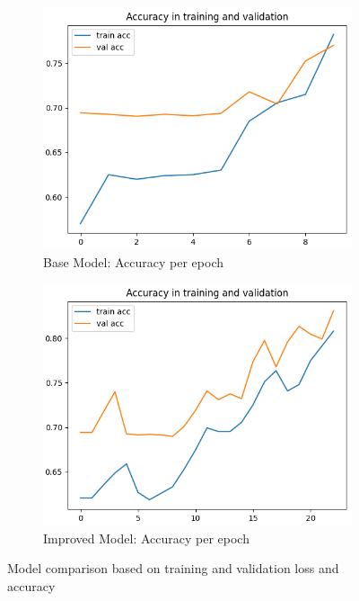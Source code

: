 \documentclass[
a4paper,     %
10pt         %
]{scrartcl}  %
\begin{document}
\begin{figure}[h]
\begin{subfigure}{.5\textwidth}
        \centering
        \includegraphics[width=\linewidth]{figures/base_model_accuracy}
        \caption{Base Model: Accuracy per epoch}
    \end{subfigure}
    \begin{subfigure}{.5\textwidth}
        \centering
        \includegraphics[width=\linewidth]{figures/reg_model_acc}
        \caption{Improved Model: Accuracy per epoch}
    \end{subfigure}
    \caption{\label{fig:model_comp}Model comparison based on training and validation loss and accuracy}
\end{figure}
\end{document}
